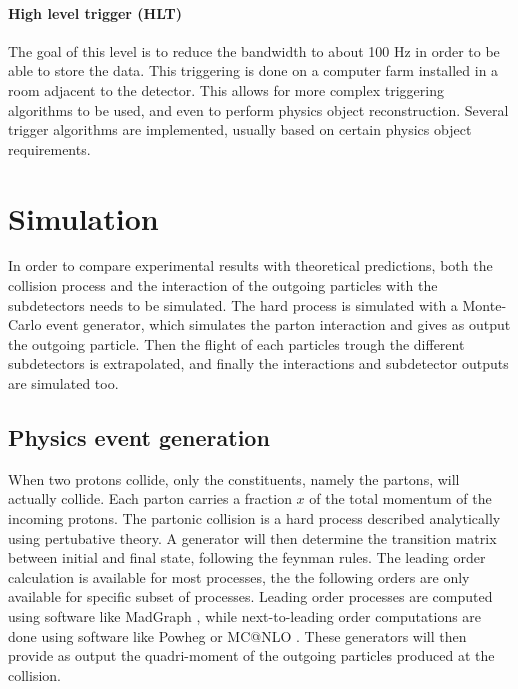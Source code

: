 \paragraph{High level trigger (HLT)} The goal of this level is to reduce the bandwidth to about 100 Hz in order to be able to store the data. This triggering is done on a computer farm installed in a room adjacent to the detector. This allows for more complex triggering algorithms to be used, and even to perform physics object reconstruction. Several trigger algorithms are implemented, usually based on certain physics object requirements.

\section{Simulation}
\label{sec:simulation}

In order to compare experimental results with theoretical predictions, both the collision process and the interaction of the outgoing particles with the subdetectors needs to be simulated. The hard process is simulated with a Monte-Carlo event generator, which simulates the parton interaction and gives as output the outgoing particle. Then the flight of each particles trough the different subdetectors is extrapolated, and finally the interactions and subdetector outputs are simulated too.

\subsection{Physics event generation} 
\label{sec:cms_physics_event_generation}

When two protons collide, only the constituents, namely the partons, will actually collide. Each parton carries a fraction $x$ of the total momentum of the incoming protons. The partonic collision is a hard process described analytically using pertubative theory. A generator will then determine the transition matrix between initial and final state, following the feynman rules. The leading order calculation is available for most processes, the the following orders are only available for specific subset of processes. Leading order processes are computed using software like MadGraph \cite{Alwall2011}, while next-to-leading order computations are done using software like Powheg \cite{Alioli2010} or MC@NLO \cite{Frixione_2002}.
These generators will then provide as output the quadri-moment of the outgoing particles produced at the collision.

